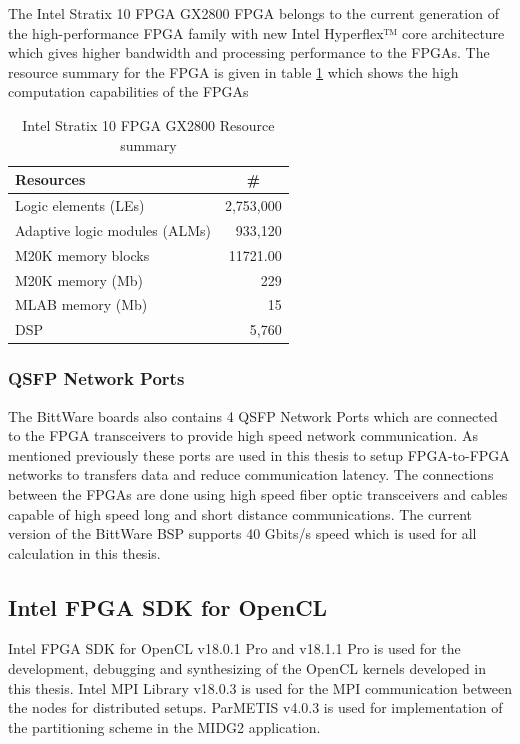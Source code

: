 The Intel Stratix 10 FPGA GX2800 FPGA belongs to the current generation of the high-performance FPGA
family with new Intel Hyperflex™ core architecture which gives higher bandwidth and processing
performance to the FPGAs. The resource summary for the FPGA is given in table \ref{tab:res_sum}
which shows the high computation capabilities of the FPGAs
\begin{table}[]
    \centering
    \caption{Intel Stratix 10 FPGA GX2800 Resource summary}
    \label{tab:res_sum}
    \begin{tabular}{lr}
    \hline
    \textbf{Resources} & \multicolumn{1}{c}{\textbf{\#}} \\ \hline
    Logic elements (LEs) & 2,753,000 \\ \hline
    Adaptive logic modules (ALMs) & 933,120 \\ \hline
    M20K memory blocks & 11721.00 \\ \hline
    M20K memory (Mb) & 229 \\ \hline
    MLAB memory (Mb) & 15 \\ \hline
    DSP & 5,760 \\ \hline
    \end{tabular}%
\end{table}

\subsubsection*{QSFP Network Ports}

The BittWare boards also contains 4 QSFP Network Ports which
are connected to the FPGA transceivers to provide high speed network communication. As mentioned
previously these ports are used in this thesis to setup FPGA-to-FPGA networks to transfers data
and reduce communication latency. The connections between the FPGAs are done using
high speed fiber optic transceivers and cables capable of high speed long and short distance communications.
The current version of the BittWare BSP supports 40 Gbits/s speed which is used for all calculation in this thesis.

\subsection{Intel FPGA SDK for OpenCL}

Intel FPGA SDK for OpenCL v18.0.1 Pro and v18.1.1 Pro is used for the development,
debugging and synthesizing of the OpenCL kernels developed in this thesis.
Intel MPI Library v18.0.3 is used for the MPI communication between the nodes
for distributed setups. ParMETIS v4.0.3 is used for implementation of the partitioning
scheme in the MIDG2 application.

